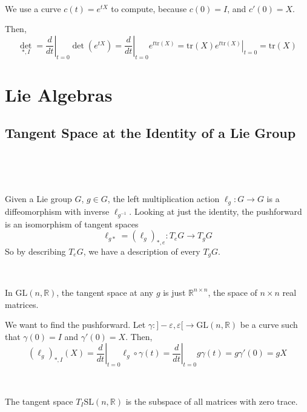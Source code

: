 \documentclass{article}
\begin{document}
\begin{customproof}
  \

  We use a curve $c(t) = e^{tX}$ to compute, because $c(0) = I$, and $c'(0) = X$.

  Then, $$\det_{*, I} = \left.\frac{d}{dt}\right\vert_{t=0} \det(e^{tX}) = \left.\frac{d}{dt}\right\vert_{t=0} e^{t\text{tr}(X)} = \left. \text{tr}(X)e^{t \text{tr}(X)} \right\vert_{t=0} = \text{tr}(X)$$
\end{customproof}

\section{Lie Algebras}

\subsection{Tangent Space at the Identity of a Lie Group}
\

\begin{remark}
  \

  Given a Lie group $G$, $g \in G$, the left multiplication action $\ell_g: G \to G$ is a diffeomorphism with inverse $\ell_{g ^{-1}}$. Looking at just the identity, the pushforward is an isomorphism of tangent spaces $$\ell_{g*} = (\ell_g)_{*,e}: T_eG \to T_gG$$So by describing $T_eG$, we have a description of every $T_gG$.
\end{remark}

\begin{example}
  \

  In $\text{GL}(n, \mathbb{R})$, the tangent space at any $g$ is just $\mathbb{R}^{n \times n}$, the space of $n \times n$ real matrices.

We want to find the pushforward. Let $\gamma: ]-\varepsilon, \varepsilon[ \to \text{GL}(n, \mathbb{R})$ be a curve such that $\gamma(0) = I$ and $\gamma'(0) = X$. Then, $$(\ell_g)_{*, I}(X) = \left.\frac{d}{dt}\right\vert_{t=0} \ell_g \circ \gamma(t) = \left.\frac{d}{dt}\right\vert_{t=0}g\gamma(t) = g\gamma'(0) = gX$$
\end{example}

\begin{proposition}
  \

  The tangent space $T_I \text{SL}(n, \mathbb{R})$ is the subspace of all matrices with zero trace.
\end{proposition}
\end{document}
